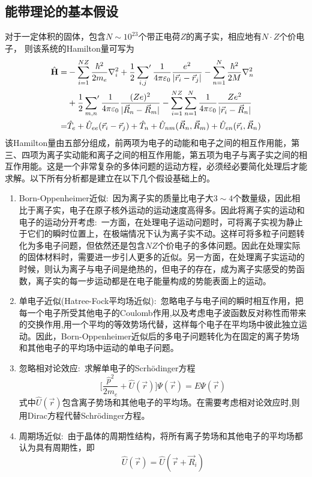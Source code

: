 \subsection{能带理论的基本假设} 
对于一定体积的固体，包含$N\sim10^{23}$个带正电荷$Z$的离子实，相应地有$N\cdot Z$个价电子，%
则该系统的Hamilton量可写为
\begin{equation}
	\begin{aligned}
		\hat{\mathbf H}=&-\sum_{i=1}^{NZ}\dfrac{\hbar^2}{2m_e}\nabla_i^2+\dfrac12\sideset{}{^{\prime}}\sum_{i,j}\dfrac1{4\pi\varepsilon_0}\dfrac{e^2}{|\vec r_i-\vec r_j|}-\sum_{n=1}^N\dfrac{\hbar^2}{2M}\nabla_n^2\\
		&+\dfrac12\sideset{}{^{\prime}}\sum_{m,n}\dfrac1{4\pi\varepsilon_0}\dfrac{(Ze)^2}{|\vec R_n-\vec R_m|}-\sum_{i=1}^{NZ}\sum_{n=1}^{N}\dfrac1{4\pi\varepsilon_0}\dfrac{Ze^2}{|\vec r_i-\vec R_n|}\\
		=&\hat T_e+\hat U_{ee}(\vec r_i-\vec r_j)+\hat T_n+\hat U_{nm}(\vec R_n,\vec R_m)+\hat U_{en}(\vec r_i,\vec R_n)
	\end{aligned}
	\label{eq:electron-Nuclear_Hamiltonian}
\end{equation}
该Hamilton量由五部分组成，前两项为电子的动能和电子之间的相互作用能，第三、四项为离子实动能和离子之间的相互作用能，第五项为电子与离子实之间的相互作用能。这是一个非常复杂的多体问题的运动方程，必须经必要简化处理后才能求解。以下所有分析都是建立在以下几个假设基础上的。
\begin{enumerate}
	\item Born-Oppenheimer近似:~因为离子实的质量比电子大$3\sim4$个数量级，因此相比于离子实，电子在原子核外运动的运动速度高得多。因此将离子实的运动和电子的运动分开考虑:~一方面，在处理电子运动问题时，可将离子实视为静止于它们的瞬时位置上，在极端情况下认为离子实不动。这样可将多粒子问题转化为多电子问题，但依然还是包含$NZ$个价电子的多体问题。因此在处理实际的固体材料时，需要进一步引人更多的近似。另一方面，在处理离子实运动的时候，则认为离子与电子间是绝热的，但电子的存在，成为离子实感受的势函数，离子实的每一步运动都是在电子能量构成的势能表面上的运动。
	\item 单电子近似(Hatree-Fock平均场近似):~忽略电子与电子间的瞬时相互作用，把每一个电子所受其他电子的Coulomb作用,以及考虑电子波函数反对称性而带来的交换作用,用一个平均的等效势场代替，这样每个电子在平均场中彼此独立运动。因此，Born-Oppenheimer近似后的多电子问题转化为在固定的离子势场和其他电子的平均场中运动的单电子问题。
	\item 忽略相对论效应:~求解单电子的Scrh\"odinger方程
		\begin{equation}
			\bigg[\dfrac{\hat p^2}{2m_e}+\hat U(\vec r)\bigg]\Psi(\vec r)=E\Psi(\vec r)
				\label{eq:Schrondinger_equation}
		\end{equation} 
式中$\hat U(\vec r)$包含离子势场和其他电子的平均场。在需要考虑相对论效应时,则用Dirac方程代替Schr\"odinger方程。
\item 周期场近似:~由于晶体的周期性结构，将所有离子势场和其他电子的平均场都认为具有周期性，即
	\begin{equation}
		\hat U(\vec r)=\hat U(\vec r+\vec R_i)
		\label{eq:Perodic_Potential}
	\end{equation}
\end{enumerate} 
